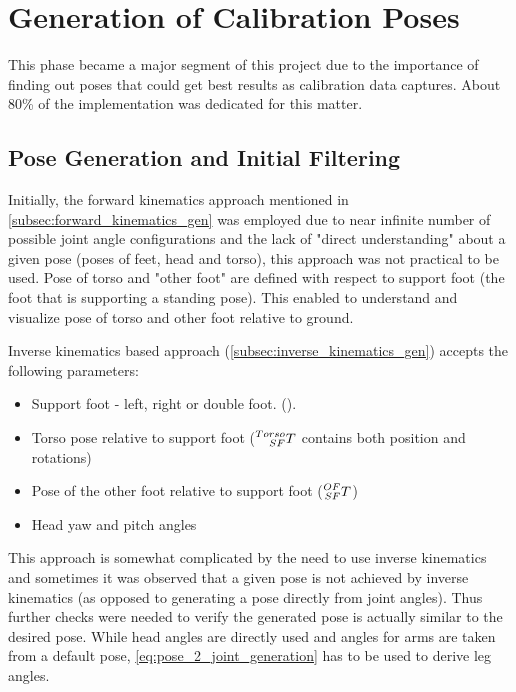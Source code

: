\documentclass[english, printversion, nomenclature, notitle]{tuvisionthesis} %
\begin{document}
\section{Generation of Calibration Poses}
\label{sec:poseGen}

This phase became a major segment of this project due to the importance of finding out poses that could get best results as calibration data captures. About 80\% of the implementation was dedicated for this matter.

\subsection{Pose Generation and Initial Filtering}

Initially, the forward kinematics approach mentioned in \cref{subsec:forward_kinematics_gen} was employed due to near infinite number of possible joint angle configurations and the lack of "direct understanding" about a given pose (poses of feet, head and torso), this approach was not practical to be used. Pose of torso and "other foot" are defined with respect to support foot (the foot that is supporting a standing pose). This enabled to understand and visualize pose of torso and other foot relative to ground.

Inverse kinematics based approach (\cref{subsec:inverse_kinematics_gen}) accepts the following parameters:
\begin{itemize}
	\item Support foot - left, right or double foot. (\cite{honda-humanoid, kuffner2002dynamically}).
	\item Torso pose relative to support foot ($\prescript{Torso}{SF}{T}$ contains both position and rotations)
	\item Pose of the other foot relative to support foot ($\prescript{OF}{SF}{T}$)
	\item Head yaw and pitch angles
\end{itemize}

This approach is somewhat complicated by the need to use inverse kinematics and sometimes it was observed that a given pose is not achieved by inverse kinematics (as opposed to generating a pose directly from joint angles). Thus further checks were needed to verify the generated pose is actually similar to the desired pose. While head angles are directly used and angles for arms are taken from a default pose, \cref{eq:pose_2_joint_generation} has to be used to derive leg angles.
\end{document}
